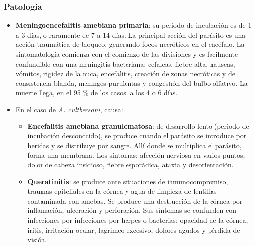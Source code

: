 \documentclass[10pt,a4paper,onecolumn,openany]{book}
\begin{document}
\subsubsection{Patología}
\begin{itemize}[itemsep=0pt,parsep=0pt,topsep=0pt,partopsep=0pt]
	\item\textbf{Meningoencefalitis amebiana primaria}: su periodo de incubación es de 1 a 3 días, o raramente de 7 a 14 días. La principal acción del parásito es una acción traumática de bloqueo, generando focos necróticos en el encéfalo. La sintomatología comienza con el comienzo de las divisiones y es facilmente confundible con una meningitis bacteriana: cefaleas, fiebre alta, nauseas, vómitos, rigidez de la nuca, encefalitis, creación de zonas necróticas y de consistencia blanda, meninges purulentas y congestión del bulbo olfativo. La muerte llega, en el 95 \% de los casos, a los 4 o 6 días.
	\item En el caso de \textit{A. cultbersoni}, causa:
	\begin{itemize}[itemsep=0pt,parsep=0pt,topsep=0pt,partopsep=0pt]
		\item\textbf{Encefalitis amebiana granulomatosa}: de desarrollo lento (periodo de incubación desconocido), se produce cuando el parásito se introduce por heridas y se distribuye por sangre. Allí donde se multiplica el parásito, forma una membrana. Los síntomas: afección nerviosa en varios puntos, dolor de cabeza insidioso, fiebre esporádica, ataxia y desorientación.
		\item\textbf{Queratinitis}: se produce ante situaciones de inmunocompromiso, traumas epiteliales en la córnea y agua de limpieza de lentillas contaminada con amebas. Se produce una destrucción de la córnea por inflamación, ulceración y perforación. Sus síntomas se confunden con infecciones por infecciones por herpes o bacterias: opacidad de la córnea, iritis, irritación ocular, lagrimeo excesivo, dolores agudos y pérdida de visión.
	\end{itemize}
\end{itemize}
\end{document}
